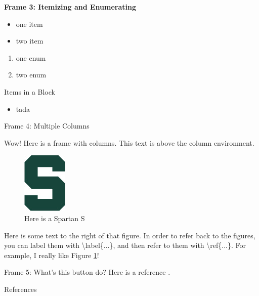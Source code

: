 \documentclass[aspectratio=169]{beamer}
\begin{document}
\begin{frame}{\bfseries Frame 3: Itemizing and Enumerating}

\begin{itemize}
\item one item
\item two item
\end{itemize}

\begin{enumerate}
\item one enum
\item two enum
\end{enumerate}

\begin{block}{Items in a Block}
\begin{itemize}
    \item tada
\end{itemize}
\end{block}

\end{frame}

\begin{frame}{Frame 4: Multiple Columns}
    \begin{alertblock}{Wow!}
        Here is a frame with columns. This text is above the column environment.
    \end{alertblock}

    
\begin{multicols}{2}
\begin{figure}[H]
\centering
\includegraphics[scale=.5]{spartans.jpg}
\caption{Here is a Spartan S}\label{fig:spartans}
\end{figure}
\columnbreak

Here is some text to the right of that figure. 
In order to refer back to the figures, you can label them with {\ttfamily\textbackslash label\{...\}}, and then refer to them with {\ttfamily\textbackslash ref\{...\}}.  For example, I really like Figure \ref{fig:spartans}!

\end{multicols}
\end{frame}

\begin{frame}{Frame 5: What's this button do?}
\label{back}
    \hyperlink{outline}{}
    Here is a reference \cite{cite1}.
\end{frame}
\begin{frame}{References}
    
    
\end{frame}


\end{document}
